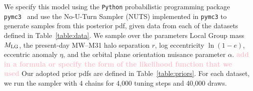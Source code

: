 \documentclass[twocolumn]{aastex631}
\newcommand{\kc}[1]{\textcolor{pink}{\textbf{#1}} }
\newcommand{\mlg}{\ensuremath{M_{\rm LG}}}
\begin{document}
We specify this model using the \texttt{Python} probabilistic programming
package \texttt{pymc3}~\citep{Salvatier2016} and use the No-U-Turn Sampler
(NUTS) \citep{Homan2014} implemented in \texttt{pymc3} to generate samples from
this posterior pdf, given data from each of the datasets defined in
Table~\ref{table:data}.
We sample over the parameters Local Group mass $\mlg$, the present-day MW--M31
halo separation $r$, log eccentricity $\ln\left(1 - e\right)$, eccentric anomaly
$\eta$, and the orbital plane orientation nuisance parameter $\alpha$. \kc{add in a formula or specify the form of the likelihood function that we used}
Our adopted prior pdfs are defined in Table~\ref{table:priors}.
For each dataset, we run the sampler with 4 chains for 4,000 tuning steps and
40,000 draws.
\end{document}
